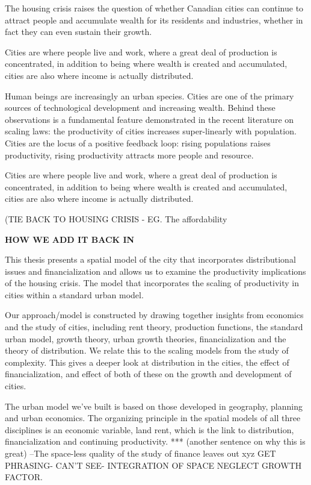 The housing crisis raises the question of whether Canadian cities can continue to attract people and accumulate wealth for its residents and industries, whether in fact they can even sustain their growth.

Cities are where people live and work, where a great deal of production is concentrated, in addition to being where wealth is created and accumulated, cities are also where income is actually distributed. 

Human beings are increasingly an urban species. Cities are one of the primary sources of technological development and increasing wealth. Behind these observations is a fundamental feature demonstrated in the recent literature on scaling laws: the productivity of cities increases super-linearly with population. Cities are the locus of a positive feedback loop: rising populations raises productivity, rising productivity attracts more people and resource.

Cities are where people live and work, where a great deal of production is concentrated, in addition to being where wealth is created and accumulated, cities are also where income is actually distributed. 

(TIE BACK TO HOUSING CRISIS - EG. The affordability 

\textbf{HOW WE ADD IT BACK IN}

This thesis presents a spatial model of the city that incorporates distributional issues and financialization and allows us to examine the productivity implications of the housing crisis. The model that incorporates the scaling of productivity in cities within a standard urban model. 

Our approach/model is constructed by drawing together insights from %
economics and the study of cities, including rent theory, production functions, the standard urban model, growth theory, urban growth theories, financialization and the theory of distribution.
We relate this to the scaling models from the study of complexity. This gives a deeper look at distribution in the cities, the effect of financialization, and effect of both of these on the growth and development of cities. 

The urban model we've built is based on those developed in geography, planning and urban economics. The organizing principle in  the spatial models of all three disciplines is an economic variable, land rent, which is the link to distribution, financialization and continuing productivity. *** (another sentence on why this is great)
--The space-less quality of the study of finance leaves out xyz GET PHRASING- CAN'T SEE- INTEGRATION OF SPACE NEGLECT GROWTH FACTOR. 

